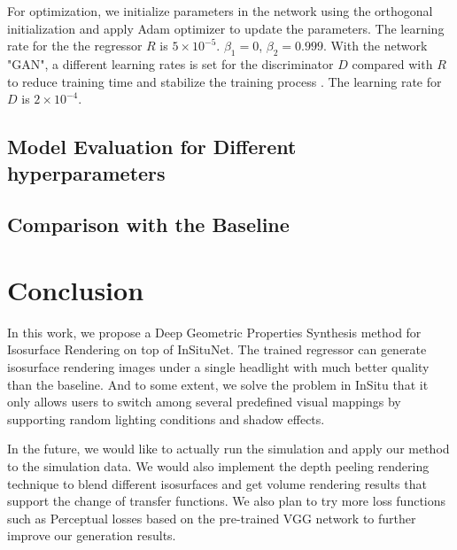 \documentclass[journal]{vgtc}                %
\begin{document}
For optimization, we initialize parameters in the network using the orthogonal
initialization \cite{saxe2013exact} and apply Adam optimizer \cite{kingma2014adam} to update the parameters. The learning rate for the the regressor $R$ is $5 \times 10^{-5}$. $\beta_1 = 0$, $\beta_2 = 0.999$. With the network "GAN", a different learning rates is set for the discriminator $D$ compared with $R$ to reduce training time and stabilize the training process \cite{roth2017stabilizing}. The learning rate for $D$ is $2 \times 10^{-4}$. 

\subsection{Model Evaluation for Different hyperparameters }

\subsection{Comparison with the Baseline}




\section{Conclusion}
In this work, we propose a Deep Geometric Properties Synthesis method for Isosurface Rendering on top of InSituNet. The trained regressor can generate isosurface rendering images under a single headlight with much better quality than the baseline. And to some extent, we solve the problem in InSitu that it only allows users to switch among several predefined visual mappings by supporting random lighting conditions and shadow effects. 

In the future, we would like to actually run the simulation and apply our method to the simulation data. We would also implement the depth peeling rendering technique to blend different isosurfaces and get volume rendering results that support the change of transfer functions. We also plan to try more loss functions such as Perceptual losses based on the pre-trained VGG network \cite{gatys2016image} to further improve our generation results. 

%

%
%
%


\end{document}
